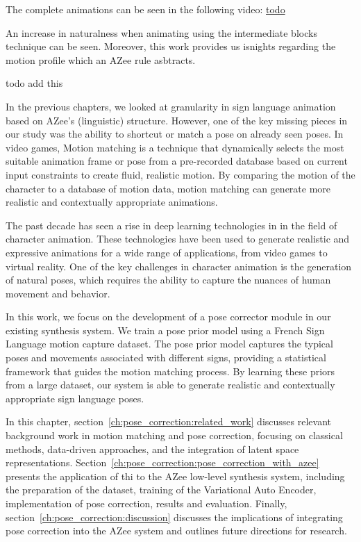 \documentclass[../../main.tex]{subfiles}
\begin{document}
The complete animations can be seen in the following video: \url{todo}

An increase in naturalness when animating using the intermediate blocks technique can be seen. Moreover, this work provides us isnights regarding the motion profile which an AZee rule asbtracts.

todo add this


In the previous chapters, we looked at granularity in sign language animation based on AZee's (linguistic) structure. However, one of the key missing pieces in our study was the ability to shortcut or match a pose on already seen poses. In video games, Motion matching is a technique that dynamically selects the most suitable animation frame or pose from a pre-recorded database based on current input constraints to create fluid, realistic motion. By comparing the motion of the character to a database of motion data, motion matching can generate more realistic and contextually appropriate animations.

The past decade has seen a rise in deep learning technologies in in the field of character animation. These technologies have been used to generate realistic and expressive animations for a wide range of applications, from video games to virtual reality. One of the key challenges in character animation is the generation of natural poses, which requires the ability to capture the nuances of human movement and behavior. 

In this work, we focus on the development of a pose corrector module in our existing synthesis system. We train a pose prior model using a French Sign Language motion capture dataset. The pose prior model captures the typical poses and movements associated with different signs, providing a statistical framework that guides the motion matching process. By learning these priors from a large dataset, our system is able to generate realistic and contextually appropriate sign language poses.

In this chapter, section~\ref{ch:pose_correction:related_work} discusses relevant background work in motion matching and pose correction, focusing on classical methods, data-driven approaches, and the integration of latent space representations. Section~\ref{ch:pose_correction:pose_correction_with_azee} presents the application of thi to the AZee low-level synthesis system, including the preparation of the dataset, training of the Variational Auto Encoder, implementation of pose correction, results and evaluation. Finally, section~\ref{ch:pose_correction:discussion} discusses the implications of integrating pose correction into the AZee system and outlines future directions for research.
\end{document}
